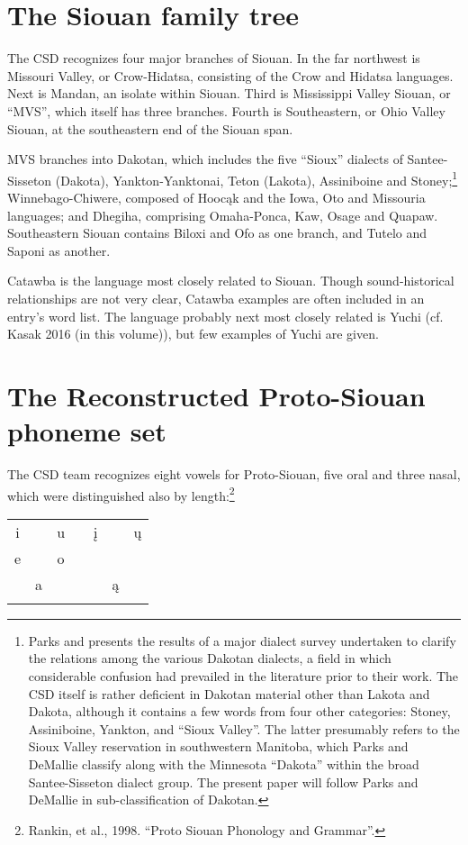 \documentclass[output=paper]{LSP/langsci}
\begin{document}
\section{The Siouan family tree}

The CSD recognizes four major branches of Siouan. In the far northwest is Missouri Valley, or Crow-Hidatsa, consisting of the Crow and Hidatsa languages. Next is Mandan, an isolate within Siouan. Third is Mississippi Valley Siouan, or ``MVS'', which itself has three branches. Fourth is Southeastern, or Ohio Valley Siouan, at the southeastern end of the Siouan span.

MVS branches into Dakotan, which includes the five ``Sioux'' dialects of Santee-Sisseton (Dakota), Yankton-Yanktonai, Teton (Lakota), Assiniboine and Stoney;\footnote{Parks and \citet{DeMallie1992} presents the results of a major dialect survey undertaken to clarify the relations among the various Dakotan dialects, a field in which considerable confusion had prevailed in the literature prior to their work.  The CSD itself is rather deficient in Dakotan material other than Lakota and Dakota, although it contains a few words from four other categories: Stoney, Assiniboine, Yankton, and ``Sioux Valley''.  The latter presumably refers to the Sioux Valley reservation in southwestern Manitoba, which Parks and DeMallie classify along with the Minnesota ``Dakota'' within the broad Santee-Sisseton dialect group.  The present paper will follow Parks and DeMallie in sub-classification of Dakotan.}  Winnebago-Chiwere, composed of Hooc\k{a}k and the Iowa, Oto and Missouria languages; and Dhegiha, comprising Omaha-Ponca, Kaw, Osage and Quapaw.  Southeastern Siouan contains Biloxi and Ofo as one branch, and Tutelo and Saponi as another.

Catawba is the language most closely related to Siouan.  Though sound-historical relationships are not very clear, Catawba examples are often included in an entry's word list.  The language probably next most closely related is Yuchi (cf. Kasak 2016 (in this volume)), but few examples of Yuchi are given.


\section{The Reconstructed Proto-Siouan phoneme set}

The CSD team recognizes eight vowels for Proto-Siouan, five oral and three nasal, which were distinguished also by length:\footnote{Rankin, et al., 1998. ``Proto Siouan Phonology and Grammar''.}
\begin{center}
\begin{tabular}[t]{c c c c c c c}
\lsptoprule
i & & u & & \k{i} & & \k{u}\\

e & & o \\

 & a & & & & \k{a} \\
\lspbottomrule
\end{tabular}
\end{center}		
\end{document}
